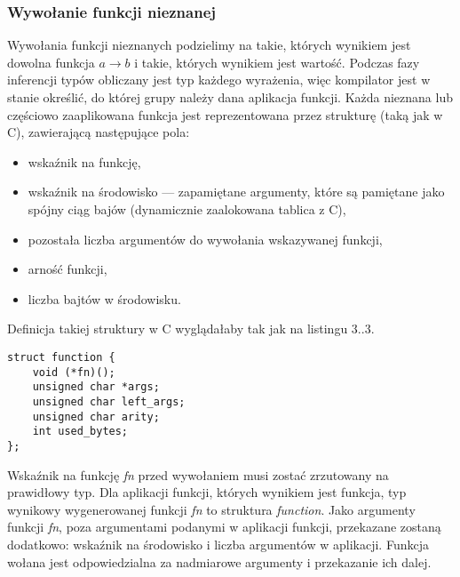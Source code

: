 \documentclass[declaration,shortabstract]{iithesis}
\begin{document}
\subsubsection{Wywołanie funkcji nieznanej}

Wywołania funkcji nieznanych podzielimy na takie, których wynikiem jest dowolna
funkcja $ a \rightarrow b $ i takie, których wynikiem jest wartość. Podczas
fazy inferencji typów obliczany jest typ każdego wyrażenia, więc kompilator
jest w stanie określić, do której grupy należy dana aplikacja funkcji. Każda 
nieznana lub częściowo zaaplikowana funkcja jest reprezentowana przez strukturę 
(taką jak w C), 
zawierającą następujące pola:

\begin{itemize}
  \item wskaźnik na funkcję,
  \item wskaźnik na środowisko --- zapamiętane argumenty, które są pamiętane 
  jako spójny ciąg bajów (dynamicznie zaalokowana tablica z C),
  \item pozostała liczba argumentów do wywołania wskazywanej funkcji,
  \item arność funkcji,
  \item liczba bajtów w środowisku.
\end{itemize}

Definicja takiej struktury w C wyglądałaby tak jak na listingu $3..3$.

\begin{lstlisting}[frame=single, caption=Rozwinięta funkcja w OCamlu.]
struct function {
    void (*fn)();
    unsigned char *args;
    unsigned char left_args;
    unsigned char arity;
    int used_bytes;   
};
\end{lstlisting}

Wskaźnik na funkcję \textit{fn} przed wywołaniem musi zostać zrzutowany na 
prawidłowy typ. Dla aplikacji funkcji, których wynikiem jest funkcja, typ 
wynikowy wygenerowanej funkcji \textit{fn} to struktura \textit{function}. 
Jako argumenty 
funkcji \textit{fn}, poza argumentami podanymi w aplikacji funkcji, przekazane 
zostaną dodatkowo: wskaźnik na środowisko i liczba argumentów w aplikacji.
Funkcja wołana jest odpowiedzialna za nadmiarowe argumenty i przekazanie ich 
dalej.
\end{document}
